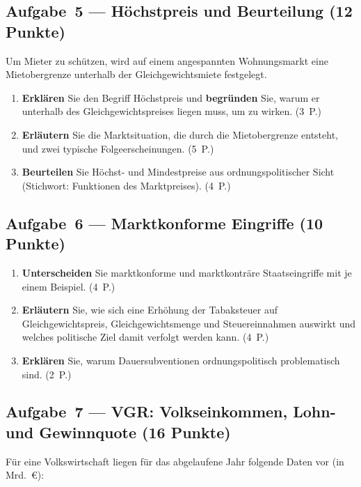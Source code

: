 \documentclass[11pt, a4paper]{article}
\begin{document}
\subsection*{Aufgabe~5 --- Höchstpreis und Beurteilung (12 Punkte)}

Um Mieter zu schützen, wird auf einem angespannten Wohnungsmarkt eine Mietobergrenze
unterhalb der Gleichgewichtsmiete festgelegt.

\begin{enumerate}[label=(\alph*)]
  \item \textbf{Erklären} Sie den Begriff Höchstpreis und \textbf{begründen} Sie, warum er unterhalb des Gleichgewichtspreises liegen muss, um zu wirken. \hfill (3~P.)
  \item \textbf{Erläutern} Sie die Marktsituation, die durch die Mietobergrenze entsteht, und zwei typische Folgeerscheinungen. \hfill (5~P.)
  \item \textbf{Beurteilen} Sie Höchst- und Mindestpreise aus ordnungspolitischer Sicht (Stichwort: Funktionen des Marktpreises). \hfill (4~P.)
\end{enumerate}

\subsection*{Aufgabe~6 --- Marktkonforme Eingriffe (10 Punkte)}

\begin{enumerate}[label=(\alph*)]
  \item \textbf{Unterscheiden} Sie marktkonforme und marktkonträre Staatseingriffe mit je einem Beispiel. \hfill (4~P.)
  \item \textbf{Erläutern} Sie, wie sich eine Erhöhung der Tabaksteuer auf Gleichgewichtspreis, Gleichgewichtsmenge und Steuereinnahmen auswirkt und welches politische Ziel damit verfolgt werden kann. \hfill (4~P.)
  \item \textbf{Erklären} Sie, warum Dauersubventionen ordnungspolitisch problematisch sind. \hfill (2~P.)
\end{enumerate}

\subsection*{Aufgabe~7 --- VGR: Volkseinkommen, Lohn- und Gewinnquote (16 Punkte)}

Für eine Volkswirtschaft liegen für das abgelaufene Jahr folgende Daten vor (in Mrd.~€):
\end{document}
